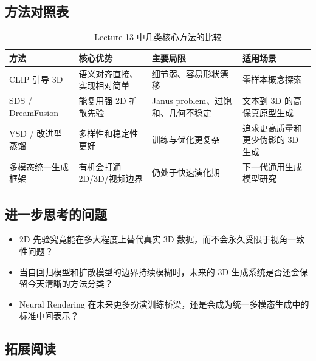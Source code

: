 \documentclass[a4paper]{article}
\begin{document}
\subsection{方法对照表}

\begin{table}[H]
\centering
\begin{tabular}{p{} p{} p{} p{}}
\toprule
方法 & 核心优势 & 主要局限 & 适用场景 \\
\midrule
CLIP 引导 3D & 语义对齐直接、实现相对简单 & 细节弱、容易形状漂移 & 零样本概念探索 \\
SDS / DreamFusion & 能复用强 2D 扩散先验 & Janus problem、过饱和、几何不稳定 & 文本到 3D 的高保真原型生成 \\
VSD / 改进型蒸馏 & 多样性和稳定性更好 & 训练与优化更复杂 & 追求更高质量和更少伪影的 3D 生成 \\
多模态统一生成框架 & 有机会打通 2D/3D/视频边界 & 仍处于快速演化期 & 下一代通用生成模型研究 \\
\bottomrule
\end{tabular}
\caption{Lecture 13 中几类核心方法的比较}
\end{table}

\subsection{进一步思考的问题}

\begin{itemize}
    \item 2D 先验究竟能在多大程度上替代真实 3D 数据，而不会永久受限于视角一致性问题？
    \item 当自回归模型和扩散模型的边界持续模糊时，未来的 3D 生成系统是否还会保留今天清晰的方法分类？
    \item Neural Rendering 在未来更多扮演训练桥梁，还是会成为统一多模态生成中的标准中间表示？
\end{itemize}

\subsection{拓展阅读}
\end{document}
